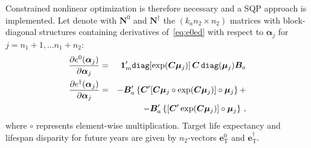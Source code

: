 \documentclass[12pt,a4paper,twoside]{article}
\begin{document}

Constrained nonlinear optimization is therefore	necessary and a SQP approach is implemented. Let denote with $\bm{N}^{0}$ and $\bm{N}^{\dagger}$ the $(k_{a}n_{2} \times n_{2})$ matrices with block-diagonal structures containing derivatives of~\eqref{eq:e0ed} with respect to $\bm{\alpha}_{j}$ for $j=n_{1}+1, \ldots n_{1}+n_{2}$:
\begin{eqnarray}\label{eq:Der}
\frac{\partial e^{0} (\bm{\alpha}_{j})}{\partial \bm{\alpha}_{j}} &=& \bm{1}_{m}' \verb"diag"[\exp(\bm{C}\bm{\mu}_{j})] \,	\bm{C} \,\verb"diag"(\bm{\mu}_{j}) \bm{B}_{a}\\
\frac{\partial e^{\dagger} (\bm{\alpha}_{j})}{\partial \bm{\alpha}_{j}} &=& - \bm{B}_{a}' \left\{ \bm{C}'[\bm{C}\bm{\mu}_{j} \circ \exp(\bm{C}\bm{\mu}_{j})] \circ \bm{\mu}_{j} \right\} + \nonumber\\
&& - \bm{B}_{a}' \left\{ [\bm{C}' \exp(\bm{C}\bm{\mu}_{j})] \circ \bm{\mu}_{j} \right\} \nonumber\, ,
\end{eqnarray}
where $\circ$ represents element-wise multiplication. Target life expectancy and lifespan disparity for future years are given by $n_{2}$-vectors $\bm{e}^{0}_{\mathrm{T}}$ and $\bm{e}^{\dagger}_{\mathrm{T}}$.
\end{document}
